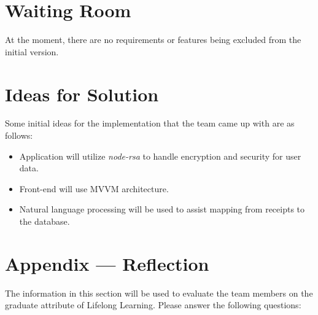 \documentclass[12pt]{article}
\begin{document}
\section{Waiting Room}
At the moment, there are no requirements or features being excluded from the initial version.

\section{Ideas for Solution}
Some initial ideas for the implementation that the team came up with are as follows:
\begin{itemize}
    \item Application will utilize \textit{node-rsa} to handle encryption and security for user data.
    \item Front-end will use MVVM architecture.
    \item Natural language processing will be used to assist mapping from receipts to the database.
\end{itemize}

\newpage{}
\section*{Appendix --- Reflection}

The information in this section will be used to evaluate the team members on the
graduate attribute of Lifelong Learning.  Please answer the following questions:
\end{document}
